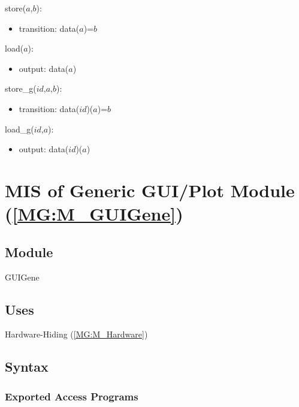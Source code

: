 \documentclass[12pt, titlepage]{article}
\begin{document}
\noindent store($a$,$b$):
\begin{itemize}
\item transition: data($a$)=$b$
\end{itemize}

\noindent load($a$):
\begin{itemize}
\item output: data($a$)
\end{itemize}

\noindent store{\_}g($id$,$a$,$b$):
\begin{itemize}
\item transition: data($id$)($a$)=$b$
\end{itemize}

\noindent load{\_}g($id$,$a$):
\begin{itemize}
\item output: data($id$)($a$)
\end{itemize}

\section{MIS of Generic GUI/Plot Module (\texorpdfstring{\cref{MG:M_GUIGene}}))} 
\label{MIS_GUIGene}


\subsection{Module}
GUIGene
\subsection{Uses}
Hardware-Hiding (\cref{MG:M_Hardware})
\subsection{Syntax}

\subsubsection{Exported Access Programs}
\end{document}
